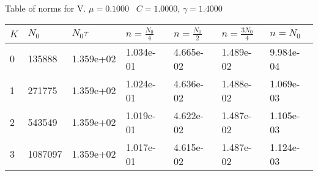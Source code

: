 \begin{center}
Table of norms for V. $\mu = 0.1000$ \, $C = 1.0000$, $\gamma = 1.4000$
  
\begin{tabular}{|p{0.8in}|p{0.8in}|p{0.8in}|p{0.8in}|p{0.8in}|p{0.8in}|p{0.8in}|} \hline
$K$ &$N_0$ &$N_0 \tau$ &$n = \frac{N_0}{4}$ &$n = \frac{N_0}{2}$ &$n = \frac{3N_0}{4}$ &$n = N_0$ \\ \hline 
0 &135888 &1.359e+02 &1.034e-01 &4.665e-02 &1.489e-02 &9.984e-04 \\ \hline 
1 &271775 &1.359e+02 &1.024e-01 &4.636e-02 &1.488e-02 &1.069e-03 \\ \hline 
2 &543549 &1.359e+02 &1.019e-01 &4.622e-02 &1.487e-02 &1.105e-03 \\ \hline 
3 &1087097 &1.359e+02 &1.017e-01 &4.615e-02 &1.487e-02 &1.124e-03 \\ \hline 

\end{tabular}\\[20pt]
\end{center}
